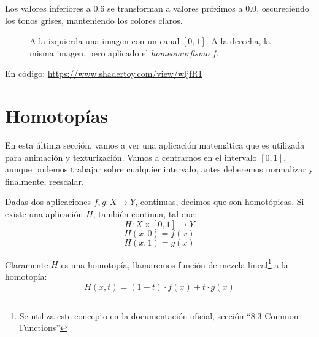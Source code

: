 Los valores inferiores a \(0.6\) se transforman a valores próximos a \(0.0\), oscureciendo los tonos grises, manteniendo los colores claros.
\begin{figure}[H]
  \centering
  \captionsetup{justification=centering}%
  \hfill
  \caption{A la izquierda una imagen con un canal \([0,1]\). A la derecha, la misma imagen, pero aplicado el \textit{homeomorfismo} \(f\).}
  \label{fig:homeomorphism}
\end{figure}
En código: \url{https://www.shadertoy.com/view/wljfR1}

\section{Homotopías}
En esta última sección, vamos a ver una aplicación matemática que es utilizada para animación y texturización. Vamos a centrarnos en el intervalo \([0, 1]\), aunque podemos trabajar sobre cualquier intervalo, antes deberemos normalizar y  finalmente, reescalar.

\begin{definition}
    Dadas dos aplicaciones \(f, g:X\longrightarrow Y\), continuas, decimos que son homotópicas. Si existe una aplicación \(H\), también continua, tal que:
    \[ H:X\times[0,1]\longrightarrow Y \]
    \[ H(x, 0)=f(x) \]
    \[ H(x, 1)=g(x) \]
\end{definition}
\begin{definition}
    Claramente \(H\) es una homotopía, llamaremos función de mezcla lineal\label{def:mix}\footnote{Se utiliza este concepto en la documentación oficial, sección \enquote{8.3 Common Functions}} a la homotopía:
    \[H(x, t)=(1-t)\cdot f(x) + t\cdot g(x)\]
\end{definition}

